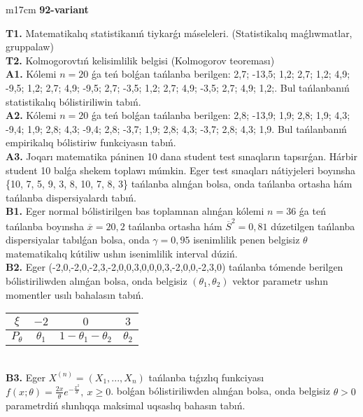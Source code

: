 \documentclass{article}
\begin{document}
\begin{tabular}{m{17cm}}
\textbf{92-variant}
\newline

\textbf{T1.} Matematikalıq statistikanıń tiykarǵı máseleleri. (Statistikalıq maǵlıwmatlar, gruppalaw)
 \\
\textbf{T2.} 
Kolmogorovtıń kelisimlilik belgisi (Kolmogorov teoreması)
 \\
\textbf{A1.} 
Kólemi \(n = 20\) ǵa teń bolǵan tańlanba berilgen: 2,7; -13,5; 1,2; 2,7; 1,2; 4,9; -9,5; 1,2; 2,7; 4,9; -9,5; 2,7; -3,5; 1,2; 2,7; 4,9; -3,5; 2,7; 4,9; 1,2;. Bul tańlanbanıń statistikalıq bólistiriliwin tabıń.
 \\
\textbf{A2.} 
Kólemi \(n = 20\) ǵa teń bolǵan tańlanba berilgen: 2,8; -13,9; 1,9; 2,8; 1,9; 4,3; -9,4; 1,9; 2,8; 4,3; -9,4; 2,8; -3,7; 1,9; 2,8; 4,3; -3,7; 2,8; 4,3; 1,9. Bul tańlanbanıń empirikalıq bólistiriw funkciyasın tabıń.
 \\
\textbf{A3.} 
Joqarı matematika páninen 10 dana student test sınaqların tapsırǵan. Hárbir student 10 balǵa shekem toplawı múmkin. Eger test sınaqları nátiyjeleri boyınsha \{10, 7, 5, 9, 3, 8, 10, 7, 8, 3\} tańlanba alınǵan bolsa, onda tańlanba ortasha hám tańlanba dispersiyalardı tabıń.
 \\
\textbf{B1.} 
Eger normal bólistirilgen bas toplamnan alınǵan kólemi \(n = 36\) ǵa teń tańlanba boyınsha \(\overline{x} = 20,2\) tańlanba ortasha hám \({\overline{S}}^{2} = 0,81\) dúzetilgen tańlanba dispersiyalar tabılǵan bolsa, onda \(\gamma = 0,95\) isenimlilik penen belgisiz \(\theta\) matematikalıq kútiliw ushın isenimlilik interval dúziń.
 \\
\textbf{B2.} 
Eger (-2,0,-2,0,-2,3,-2,0,0,3,0,0,0,3,-2,0,0,-2,3,0) tańlanba tómende berilgen bólistiriliwden alınǵan bolsa, onda belgisiz \(\left( \theta_{1},\theta_{2} \right)\) vektor parametr ushın momentler usılı bahalasın tabıń.
\begin{tabular}{|c|c|c|c|}
  \hline
$\xi$ &
$- 2$ &
$0$ &
$3$\\
\hline
\(P_{\theta}\) & \(\theta_{1}\) & \(1 - \theta_{1} - \theta_{2}\) & \(\theta_{2}\) \\
\hline
\end{tabular}
 \\
\textbf{B3.} 
Eger \(X^{(n)} = \left( X_{1},...,X_{n} \right)\) tańlanba tıǵızlıq funkciyası \(f(x;\theta) = \frac{2x}{\theta}e^{- \frac{x^{2}}{\theta}},\ x \geq 0\). bolǵan bólistiriliwden alınǵan bolsa, onda belgisiz \(\theta > 0\) parametrdiń shınlıqqa maksimal uqsaslıq bahasın tabıń.

\end{tabular}
\end{document}

